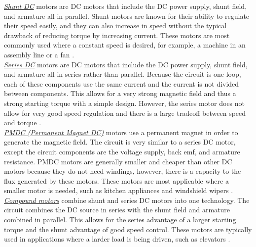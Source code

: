 \noindent \underline{\textit{Shunt DC}} motors are DC motors that include the DC power supply, shunt field, and armature all in parallel. Shunt motors are known for their ability to regulate their speed easily, and they can also increase in speed without the typical drawback of reducing torque by increasing current. These motors are most commonly used where a constant speed is desired, for example, a machine in an assembly line or a fan \cite{elprocus3}. \\

\noindent \underline{\textit{Series DC}} motors are DC motors that include the DC power supply, shunt field, and armature all in series rather than parallel. Because the circuit is one loop, each of these components use the same current and the current is not divided between components. This allows for a very strong magnetic field and thus a strong starting torque with a simple design. However, the series motor does not allow for very good speed regulation and there is a large tradeoff between speed and torque \cite{elprocus4}. \\

\noindent \underline{\textit{PMDC (Permanent Magnet DC)}} motors use a permanent magnet in order to generate the magnetic field. The circuit is very similar to a series DC motor, except the circuit components are the voltage supply, back emf, and armature resistance. PMDC motors are generally smaller and cheaper than other DC motors because they do not need windings, however, there is a capacity to the flux generated by these motors. These motors are most applicable where a smaller motor is needed, such as kitchen appliances and windshield wipers \cite{elprocus5}. \\

\noindent \underline{\textit{Compound motors}} combine shunt and series DC motors into one technology. The circuit combines the DC source in series with the shunt field and armature combined in parallel. This allows for the series advantage of a larger starting torque and the shunt advantage of good speed control. These motors are typically used in applications where a larder load is being driven, such as elevators \cite{linquip}. \\

